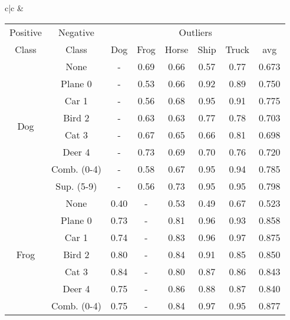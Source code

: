 \documentclass[acmtog, nonacm]{acmart}
\begin{document}
\begin{tabular}{c|c}
     &
     \begin{tabular}{@{}c|c|ccccc|c@{}}
\midrule
Positive & Negative&\multicolumn{6}{c}{Outliers} \\
\hspace{.25em}Class &\hspace{.25em}Class & Dog & Frog  & Horse & Ship  & Truck & avg\\
\midrule
\multirow{8}{*}{Dog}   &None                           & -    & 0.69 & 0.66  & 0.57 & 0.77  & 0.673                     \\
                       & Plane 0                   & -    & 0.53 & 0.66  & 0.92 & 0.89  & 0.750                \\
                       & Car 1                     & -    & 0.56 & 0.68  & 0.95 & 0.91  & 0.775                \\
                       & Bird 2                    & -    & 0.63 & 0.63  & 0.77 & 0.78  & 0.703                \\
                       & Cat 3                     & -    & 0.67 & 0.65  & 0.66 & 0.81  & 0.698                \\
                       & Deer 4                    & -    & 0.73 & 0.69  & 0.70 & 0.76  & 0.720                \\
                       & Comb. (0-4)               & -    & 0.58 & 0.67  & 0.95 & 0.94  & 0.785                \\
                       & Sup. (5-9)                & -    & 0.56 & 0.73  & 0.95 & 0.95  & 0.798                \\
\midrule
\multirow{8}{*}{Frog}  & None                      & 0.40 & -    & 0.53  & 0.49 & 0.67  & 0.523                \\
                       & Plane 0                   & 0.73 & -    & 0.81  & 0.96 & 0.93  & 0.858                \\
                       & Car 1                     & 0.74 & -    & 0.83  & 0.96 & 0.97  & 0.875                \\
                       & Bird 2                    & 0.80 & -    & 0.84  & 0.91 & 0.85  & 0.850                \\
                       & Cat 3                     & 0.84 & -    & 0.80  & 0.87 & 0.86  & 0.843                \\
                       & Deer 4                    & 0.75 & -    & 0.86  & 0.88 & 0.87  & 0.840                \\
                       & Comb. (0-4)               & 0.75 & -    & 0.84  & 0.97 & 0.95  & 0.877                \\

\end{tabular}
\end{tabular}
\end{document}
